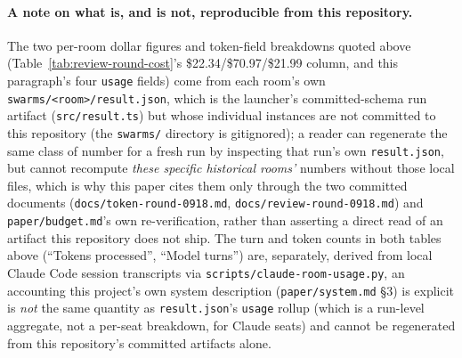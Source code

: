 \paragraph{A note on what is, and is not, reproducible from this repository.} The two
per-room dollar figures and token-field breakdowns quoted above (Table~\ref{tab:review-round-cost}'s
\$22.34/\$70.97/\$21.99 column, and this paragraph's four \texttt{usage} fields) come
from each room's own \texttt{swarms/<room>/result.json}, which is the launcher's
committed-schema run artifact (\texttt{src/result.ts}) but whose individual instances
are not committed to this repository (the \texttt{swarms/} directory is gitignored); a
reader can regenerate the same class of number for a fresh run by inspecting that run's
own \texttt{result.json}, but cannot recompute \emph{these specific historical rooms'}
numbers without those local files, which is why this paper cites them only through the
two committed documents (\texttt{docs/token-round-0918.md}, \texttt{docs/review-round-0918.md})
and \texttt{paper/budget.md}'s own re-verification, rather than asserting a direct
read of an artifact this repository does not ship. The turn and token counts in both
tables above (``Tokens processed'', ``Model turns'') are, separately, derived from local
Claude Code session transcripts via \texttt{scripts/claude-room-usage.py}, an accounting
this project's own system description (\texttt{paper/system.md} \S3) is explicit is
\emph{not} the same quantity as \texttt{result.json}'s \texttt{usage} rollup (which is a
run-level aggregate, not a per-seat breakdown, for Claude seats) and cannot be
regenerated from this repository's committed artifacts alone.
